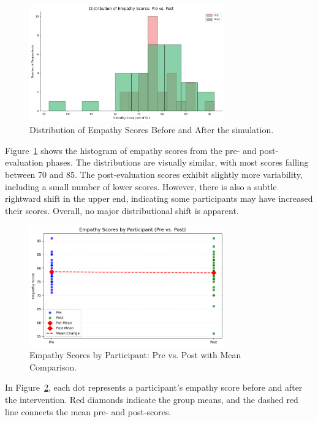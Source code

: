 \begin{figure}[htbp]
    \centering
    \includegraphics[width=0.75\textwidth]{../../Figures/emp-comparison.png}
    \caption{Distribution of Empathy Scores Before and After the simulation.}
    \label{fig:empathy_dist_hist}
\end{figure}

Figure~\ref{fig:empathy_dist_hist} shows the histogram of empathy scores from the pre- and post-evaluation phases. The distributions are visually similar, with most scores falling between 70 and 85. The post-evaluation scores exhibit slightly more variability, including a small number of lower scores. However, there is also a subtle rightward shift in the upper end, indicating some participants may have increased their scores. Overall, no major distributional shift is apparent.

\begin{figure}[htbp]
    \centering
    \includegraphics[width=0.75\textwidth]{../../Figures/emph-comparison-means.png}
    \caption{Empathy Scores by Participant: Pre vs. Post with Mean Comparison.}
    \label{fig:empathy_means_line}
\end{figure}

In Figure~\ref{fig:empathy_means_line}, each dot represents a participant’s empathy score before and after the intervention. Red diamonds indicate the group means, and the dashed red line connects the mean pre- and post-scores.

